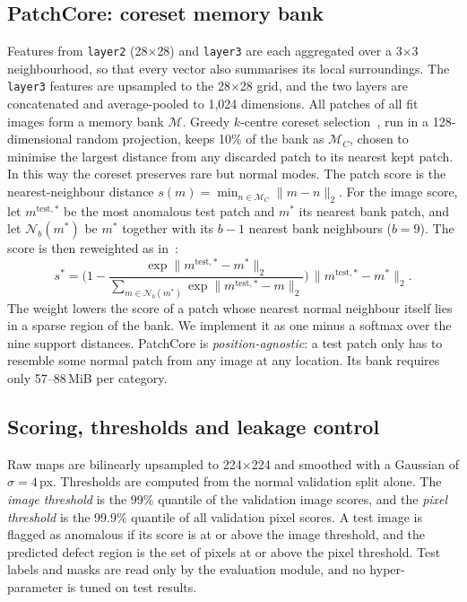 \subsection{PatchCore: coreset memory bank}
Features from \texttt{layer2} (28$\times$28) and \texttt{layer3} are each aggregated over a 3$\times$3 neighbourhood, so that every vector also summarises its local surroundings.
The \texttt{layer3} features are upsampled to the 28$\times$28 grid, and the two layers are concatenated and average-pooled to 1{,}024 dimensions.
All patches of all fit images form a memory bank $\mathcal{M}$.
Greedy $k$-centre coreset selection~\cite{sener2018coreset}, run in a 128-dimensional random projection, keeps 10\% of the bank as $\mathcal{M}_C$, chosen to minimise the largest distance from any discarded patch to its nearest kept patch.
In this way the coreset preserves rare but normal modes.
The patch score is the nearest-neighbour distance $s(m)=\min_{n\in\mathcal{M}_C}\lVert m-n\rVert_2$.
For the image score, let $m^{\mathrm{test},*}$ be the most anomalous test patch and $m^*$ its nearest bank patch, and let $\mathcal{N}_b(m^*)$ be $m^*$ together with its $b-1$ nearest bank neighbours ($b=9$).
The score is then reweighted as in~\cite[Eq.~7]{roth2022patchcore}:
\begin{equation}
  s^{*}=\Big(1-\frac{\exp\lVert m^{\mathrm{test},*}-m^{*}\rVert_2}{\sum_{m\in\mathcal{N}_b(m^{*})}\exp\lVert m^{\mathrm{test},*}-m\rVert_2}\Big)\,\lVert m^{\mathrm{test},*}-m^{*}\rVert_2 .
  \label{eq:reweight}
\end{equation}
The weight lowers the score of a patch whose nearest normal neighbour itself lies in a sparse region of the bank.
We implement it as one minus a softmax over the nine support distances.
PatchCore is \emph{position-agnostic}: a test patch only has to resemble some normal patch from any image at any location.
Its bank requires only 57--88\,MiB per category.

\subsection{Scoring, thresholds and leakage control}
Raw maps are bilinearly upsampled to 224$\times$224 and smoothed with a Gaussian of $\sigma=4$\,px.
Thresholds are computed from the normal validation split alone.
The \emph{image threshold} is the 99\% quantile of the validation image scores, and the \emph{pixel threshold} is the 99.9\% quantile of all validation pixel scores.
A test image is flagged as anomalous if its score is at or above the image threshold, and the predicted defect region is the set of pixels at or above the pixel threshold.
Test labels and masks are read only by the evaluation module, and no hyper-parameter is tuned on test results.
